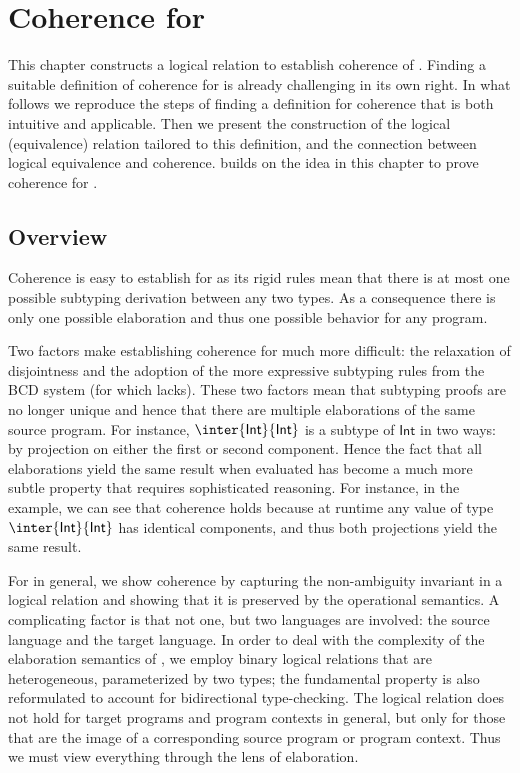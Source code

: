 
\chapter{Coherence for \namee}
\label{chap:coherence:simple}

This chapter constructs a logical relation to
establish coherence of \namee. Finding a
suitable definition of coherence for \namee is already challenging in its own
right. In what follows we reproduce the steps of finding a definition for coherence
that is both intuitive and applicable. Then we present the
construction of the logical (equivalence) relation tailored to this
definition, and the connection between logical equivalence and coherence.
 builds on the idea in this chapter to prove coherence for
\fnamee.

\section{Overview}

Coherence is easy to establish for \oname as its rigid rules mean that there is
at most one possible subtyping derivation between any two types.  As a
consequence there is only one possible elaboration and thus one
possible behavior for any program.

Two factors make establishing coherence for \namee much more difficult: the
relaxation of disjointness and the adoption of the more expressive subtyping
rules from the BCD system (for which \oname lacks). These two factors mean that subtyping proofs are no
longer unique and hence that there are multiple elaborations of the same source
program. For instance, $\inter{\mathsf{Int}}{\mathsf{Int}}$ is a subtype of $\mathsf{Int}$ in two
ways: by projection on either the first or second component.
Hence the fact that all elaborations yield the same result when evaluated has
become a much more subtle property that requires sophisticated reasoning.
For instance, in the example, we can see that coherence holds because  at
runtime any value of type $\inter{\mathsf{Int}}{\mathsf{Int}}$ has identical components, and
thus both projections yield the same result.

For \namee in general, we show coherence by capturing the non-ambiguity
invariant in a logical relation and showing that it is preserved by the
operational semantics. A complicating factor is that not one, but two languages
are involved: the source language \namee and the target language. In order to
deal with the complexity of the elaboration semantics of \namee, we employ
binary logical relations that are heterogeneous, parameterized by two types; the
fundamental property is also reformulated to account for bidirectional
type-checking. The logical relation does not hold for target programs and
program contexts in general, but only for those that are the image of a
corresponding source program or program context. Thus we must view everything
through the lens of elaboration.



